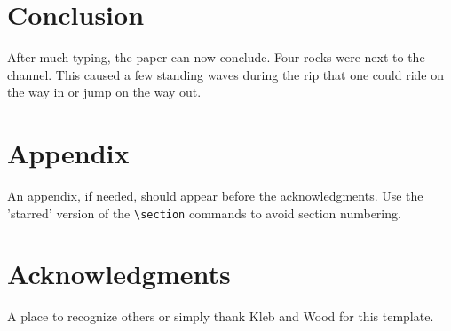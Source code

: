 \documentclass{aiaa-tc}
\begin{document}
\section{Conclusion}

After much typing, the paper can now conclude.
Four rocks were next to the channel.
This caused a few standing waves during the rip that one could ride on
the way in or jump on the way out.

\section*{Appendix}

An appendix, if needed, should appear before the acknowledgments.
Use the 'starred' version of the \verb|\section| commands to avoid
section numbering.

\section*{Acknowledgments}

A place to recognize others or simply thank Kleb and Wood for this template.



\end{document}
